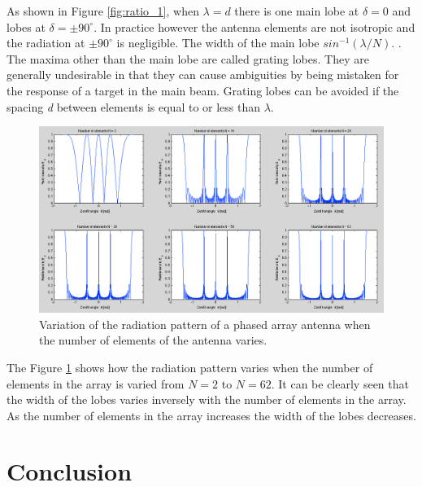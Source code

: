 \documentclass{article}
\begin{document}
As shown in Figure \ref{fig:ratio_1}, when $\lambda = d$ there is one main lobe at $\delta = 0$ and lobes at $\delta =  \pm 90^{\circ}$.  In practice however the antenna elements are not isotropic and the radiation at $\pm 90^{\circ}$ is negligible. The width of the main lobe $sin^{-1}(\lambda/N)$. \cite{Rottger:2000ip}. The maxima other than the main lobe are called grating lobes. They are generally undesirable in that they can cause ambiguities by being mistaken for the response of a target in the main beam. Grating lobes can be avoided if the spacing \textit{d} between elements is equal to or less than $\lambda$. \cite{Skolnik:2001irs}

\begin{figure}[tbh]
\centering
\includegraphics[width=\textwidth]{Figures/elements.png}
\caption{Variation of the radiation pattern of a phased array antenna when the number of elements of the antenna varies.}
\label{fig:elements}
\end{figure}

The Figure \ref{fig:elements} shows how the radiation pattern varies when the number of elements in the array is varied from $N = 2$ to $N = 62$. It can be clearly seen that the width of the lobes varies inversely with the number of elements in the array. As the number of elements in the array increases the width of the lobes decreases.
\clearpage


\section{Conclusion}

\end{document}
